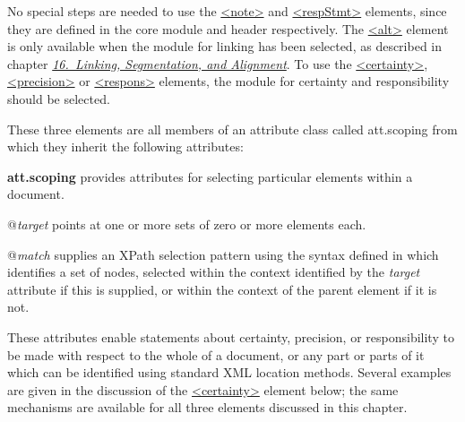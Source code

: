 \begin{itemize}
\end{itemize}  No special steps are needed to use the \hyperref[TEI.note]{<note>} and \hyperref[TEI.respStmt]{<respStmt>} elements, since they are defined in the core module and header respectively. The \hyperref[TEI.alt]{<alt>} element is only available when the module for linking has been selected, as described in chapter \textit{\hyperref[SA]{16.\ Linking, Segmentation, and Alignment}}. To use the \hyperref[TEI.certainty]{<certainty>}, \hyperref[TEI.precision]{<precision>} or \hyperref[TEI.respons]{<respons>} elements, the module for certainty and responsibility should be selected. \par
These three elements are all members of an attribute class called \textsf{att.scoping} from which they inherit the following attributes: 
\begin{sansreflist}
  
\item [\textbf{att.scoping}] provides attributes for selecting particular elements within a document.\hfil\\[-10pt]\begin{sansreflist}
    \item[@{\itshape target}]
  points at one or more sets of zero or more elements each.
    \item[@{\itshape match}]
  supplies an XPath selection pattern using the syntax defined in \cite{XSLT3} which identifies a set of nodes, selected within the context identified by the {\itshape target} attribute if this is supplied, or within the context of the parent element if it is not.
\end{sansreflist}  
\end{sansreflist}
\par
These attributes enable statements about certainty, precision, or responsibility to be made with respect to the whole of a document, or any part or parts of it which can be identified using standard XML location methods. Several examples are given in the discussion of the \hyperref[TEI.certainty]{<certainty>} element below; the same mechanisms are available for all three elements discussed in this chapter.
